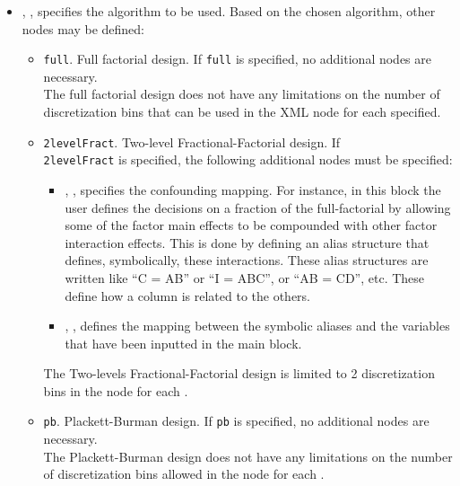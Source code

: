    \begin{itemize}
    \item {}, , specifies the
      algorithm to be used.
      Based on the chosen algorithm, other nodes may be defined:
      \begin{itemize}
        \item {}\texttt{full}. Full factorial design.
          If \texttt{full} is specified, no additional nodes are necessary.
          \\
          \nb The full factorial design does not have any limitations on the
          number of discretization bins that can be used in the 
          XML node for each  specified.
        \item {}\texttt{2levelFract}. Two-level
          Fractional-Factorial design.
          If \\\texttt{2levelFract}  is specified, the following additional
          nodes must be specified:
          \begin{itemize}
            \item {}, , specifies the confounding mapping.
              For instance, in this block the user defines the decisions on a
              fraction of the full-factorial by allowing some of the factor main
              effects to be compounded with other factor interaction effects.
              This is done by defining an alias structure that defines,
              symbolically, these interactions.
              These alias structures are written like “C = AB” or “I = ABC”, or
              “AB = CD”, etc.
              These define how a column is related to the others.
            \item {}, , defines the mapping between the  symbolic
              aliases and the variables that have been inputted in the
               main block.
          \end{itemize}
          \nb The Two-levels Fractional-Factorial design is limited to 2
          discretization bins in the  node for each
          .
       \item {}\texttt{pb}. Plackett-Burman design.
         If \texttt{pb} is specified, no additional nodes are necessary.
         \\ 
         \nb The Plackett-Burman design does not have any limitations on the
         number of discretization bins allowed in the  node for
         each .
      \end{itemize}
   
  \end{itemize}
